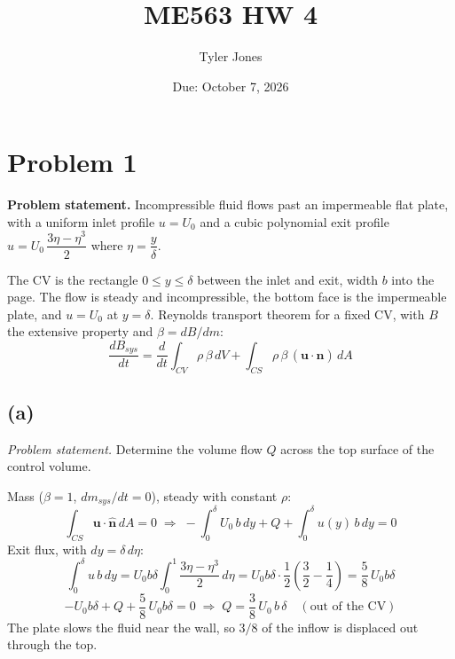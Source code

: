 \documentclass[11pt]{article}
\title{\vspace{-1.5em}\textbf{ME563 HW 4}}
\author{Tyler Jones}
\date{Due: October 7, 2026}
\newcommand{\vect}[1]{\mathbf{#1}}
\begin{document}
\maketitle
\thispagestyle{fancy}

\section*{Problem 1}

\noindent\textbf{Problem statement.} Incompressible fluid flows past an impermeable flat plate, with
a uniform inlet profile $u = U_0$ and a cubic polynomial exit profile
$u = U_0\,\dfrac{3\eta - \eta^3}{2}$ where $\eta = \dfrac{y}{\delta}$.

\medskip
\noindent The CV is the rectangle $0 \le y \le \delta$ between the inlet and exit, width $b$ into the
page. The flow is steady and incompressible, the bottom face is the impermeable plate, and $u = U_0$
at $y = \delta$. Reynolds transport theorem for a fixed CV, with $B$ the extensive property and
$\beta = dB/dm$:
\begin{equation*}
\frac{dB_{sys}}{dt} = \frac{d}{dt}\int_{CV}\rho\,\beta\,dV + \int_{CS}\rho\,\beta\,(\vect u\cdot\hat{\vect n})\,dA
\end{equation*}

\subsection*{(a)}

\noindent\textit{Problem statement.} Determine the volume flow $Q$ across the top surface of the
control volume.

\medskip
\noindent Mass ($\beta = 1$, $dm_{sys}/dt = 0$), steady with constant $\rho$:
\begin{equation*}
\int_{CS} \vect u\cdot\hat{\vect n}\,dA = 0
\;\Rightarrow\;
-\int_0^\delta U_0\,b\,dy + Q + \int_0^\delta u(y)\,b\,dy = 0
\end{equation*}
Exit flux, with $dy = \delta\,d\eta$:
\begin{equation*}
\int_0^\delta u\,b\,dy = U_0 b\delta\int_0^1 \frac{3\eta-\eta^3}{2}\,d\eta
= U_0 b\delta\cdot\frac12\left(\frac32 - \frac14\right) = \frac58\,U_0 b\delta
\end{equation*}
\begin{equation*}
-U_0 b\delta + Q + \frac58\,U_0 b\delta = 0
\;\Rightarrow\;
\boxed{Q = \frac38\,U_0\,b\,\delta \quad (\text{out of the CV})}
\end{equation*}
The plate slows the fluid near the wall, so $3/8$ of the inflow is displaced out through the top.
\end{document}
